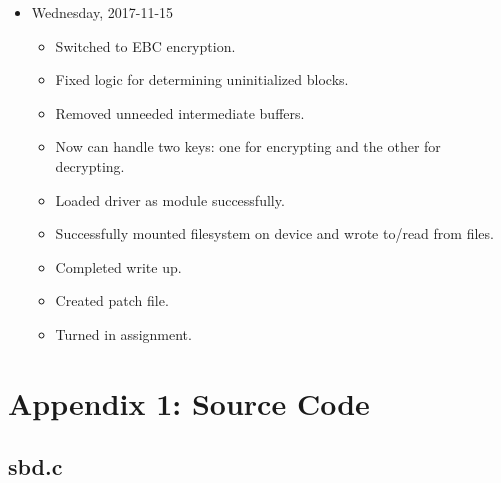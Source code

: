 \documentclass[letterpaper,10pt,titlepage,draftclsnofoot,onecolumn]{article}
\begin{document}
\begin{itemize}
	\item Wednesday, 2017-11-15
		\begin{itemize}
			\item Switched to EBC encryption.
			\item Fixed logic for determining uninitialized blocks.
			\item Removed unneeded intermediate buffers.
			\item Now can handle two keys: one for encrypting and the other for decrypting.
			\item Loaded driver as module successfully.
			\item Successfully mounted filesystem on device and wrote to/read from files.
			\item Completed write up.
			\item Created patch file.
			\item Turned in assignment.
		\end{itemize}
\end{itemize}

\section*{Appendix 1: Source Code}
\subsection{sbd.c}

\lstset{language=C}
\end{document}
